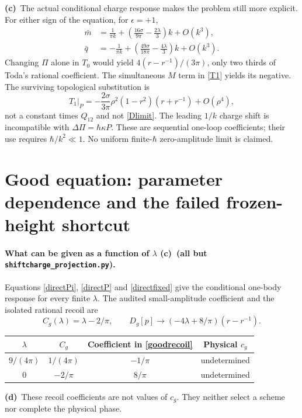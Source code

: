 \documentclass[11pt,a4paper]{article}
\newcommand{\C}{\textbf{(c)}\ }
\newcommand{\D}{\textbf{(d)}\ }
\newcommand{\file}[1]{\nolinkurl{#1}}
\newcommand{\proj}{\file{shiftcharge_projection.py}}
\begin{document}
\C The actual conditional charge response makes the problem still more
explicit. For either sign of the equation, for $\epsilon=+1$,
\begin{align}
 \bar m&=\frac1{\pi k}+\left(\frac{16\sigma}{9\pi}-\frac{2\lambda}{3}\right)k
           +O(k^3),\\
 \bar q&=-\frac1{\pi k}+\left(\frac{49\sigma}{18\pi}-\frac{4\lambda}{3}\right)k
           +O(k^3).\label{smallcharges}
\end{align}
Changing $\Pi$ alone in $T_0$ would yield $4(r-r^{-1})/(3\pi)$, only
two thirds of Toda's rational coefficient. The simultaneous $M$ term in
\eqref{T1} yields its negative. The surviving topological substitution is
\begin{equation}
 T_1|_P=-\frac{2\sigma}{3\pi}\rho^2(1-r^2)(r+r^{-1})+O(\rho^4),
 \label{toplimit}
\end{equation}
not a constant times $Q_{12}$ and not \eqref{Dlimit}. The leading
$1/k$ charge shift is incompatible with $\Delta\Pi=\hbar\kappa P$.
These are sequential one-loop coefficients; their use requires
$\hbar/k^2\ll1$. No uniform finite-$\hbar$ zero-amplitude limit is claimed.

\section{Good equation: parameter dependence and the failed frozen-height shortcut}
\paragraph{What can be given as a function of $\lambda$ \C (all but \proj).}
Equations \eqref{directPi}, \eqref{directP} and \eqref{directfixed} give the
conditional one-body response for every finite $\lambda$. The audited
small-amplitude coefficient and the isolated rational recoil are
\begin{equation}
 C_g(\lambda)=\lambda-2/\pi,\qquad
 D_g[p]\longrightarrow(-4\lambda+8/\pi)(r-r^{-1}).\label{goodrecoil}
\end{equation}
\begin{center}
\begin{tabular}{@{}cccc@{}}\toprule
$\lambda$ & $C_g$ & Coefficient in \eqref{goodrecoil} & Physical $c_g$\\\midrule
$9/(4\pi)$ & $1/(4\pi)$ & $-1/\pi$ & undetermined\\
$0$ & $-2/\pi$ & $8/\pi$ & undetermined\\\bottomrule
\end{tabular}
\end{center}
\D These recoil coefficients are not values of $c_g$. They neither select
a scheme nor complete the physical phase.
\end{document}
